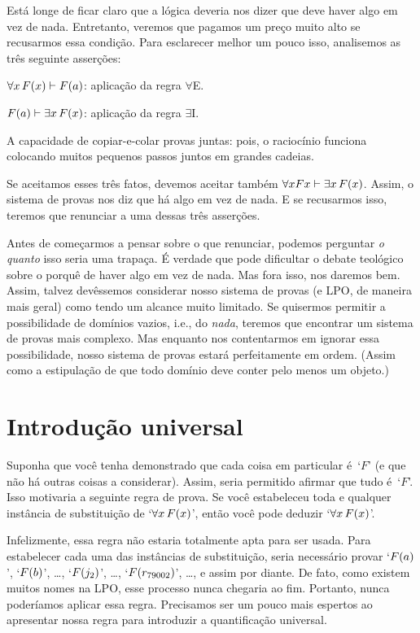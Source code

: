  
Est\'a longe de ficar claro que a l\'ogica deveria nos dizer que deve haver algo em vez de nada. Entretanto, veremos que pagamos um pre\c co muito alto se recusarmos essa condi\c c\~ao. Para esclarecer melhor um pouco isso,  analisemos as tr\^es seguinte asser\c c\~oes:
	\begin{ebullet}
		\item $\forall x\,\mathord{F}(x) \vdash \mathord{F}(a)$:  aplica\c c\~ao da regra  $\forall$E.
		\item $\mathord{F}(a) \vdash \exists x\,\mathord{F}(x)$:  aplica\c c\~ao da regra $\exists$I.
		\item A capacidade de copiar-e-colar provas juntas: pois, o racioc\'inio funciona colocando muitos pequenos passos juntos em grandes cadeias.
	\end{ebullet}
Se aceitamos esses tr\^es fatos, devemos aceitar tamb\'em $\forall xFx \vdash \exists x\,\mathord{F}(x)$.  Assim, o sistema de provas nos diz que h\'a algo em vez de nada. E se recusarmos isso, teremos que renunciar a uma dessas tr\^es asser\c c\~oes. 


Antes de come\c carmos a pensar sobre o que renunciar, podemos perguntar \emph{o quanto} isso seria uma trapa\c ca. \'E verdade que pode dificultar o debate teol\'ogico sobre o porqu\^e de haver algo em vez de nada. Mas fora isso, nos daremos bem. Assim, talvez dev\^essemos considerar nosso sistema de provas (e LPO, de maneira mais geral) como tendo um alcance muito limitado. Se quisermos permitir a possibilidade de dom\'inios vazios, i.e., do \emph{nada}, teremos que encontrar um sistema de provas mais complexo. Mas enquanto nos contentarmos em ignorar essa possibilidade, nosso sistema de provas estar\'a perfeitamente em ordem. (Assim como a estipula\c c\~ao de que todo dom\'inio deve conter pelo menos um objeto.)

\section{Introdu\c c\~ao universal}
Suponha que voc\^e tenha demonstrado que cada coisa em particular \'e~`$F$' (e que n\~ao h\'a outras coisas a considerar). Assim, seria permitido afirmar que tudo \'e~`$F$'. Isso motivaria a seguinte regra de prova. Se voc\^e estabeleceu toda e qualquer inst\^ancia de substitui\c c\~ao de `$\forall x\,\mathord{F}(x)$', ent\~ao voc\^e pode deduzir `$\forall x\,\mathord{F}(x)$'. 
 
 Infelizmente, essa regra n\~ao estaria  totalmente apta para ser usada. Para estabelecer cada uma das inst\^ancias de substitui\c c\~ao, seria necess\'ario provar  `$\mathord{F}(a)$', `$\mathord{F}(b)$', \dots, `$\mathord{F}(j_2)$', \dots, `$\mathord{F}(r_{79002})$', \ldots, e assim por diante. De fato, como existem muitos nomes na LPO, esse processo nunca chegaria ao fim. Portanto, nunca poder\'iamos aplicar essa regra. Precisamos ser um pouco mais espertos ao apresentar nossa regra para introduzir a quantifica\c c\~ao universal.
 

